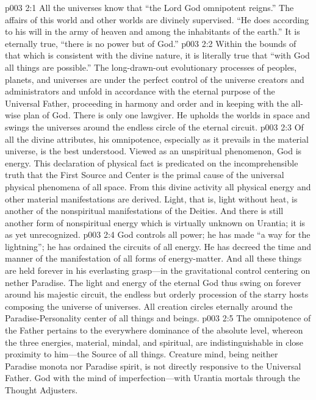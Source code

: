 \vs p003 2:1 All the universes know that “the Lord God omnipotent reigns.” The affairs of this world and other worlds are divinely supervised. “He does according to his will in the army of heaven and among the inhabitants of the earth.” It is eternally true, “there is no power but of God.”
\vs p003 2:2 Within the bounds of that which is consistent with the divine nature, it is literally true that “with God all things are possible.” The long\hyp{}drawn\hyp{}out evolutionary processes of peoples, planets, and universes are under the perfect control of the universe creators and administrators and unfold in accordance with the eternal purpose of the Universal Father, proceeding in harmony and order and in keeping with the all\hyp{}wise plan of God. There is only one lawgiver. He upholds the worlds in space and swings the universes around the endless circle of the eternal circuit.
\vs p003 2:3 Of all the divine attributes, his omnipotence, especially as it prevails in the material universe, is the best understood. Viewed as an unspiritual phenomenon, God is energy. This declaration of physical fact is predicated on the incomprehensible truth that the First Source and Center is the primal cause of the universal physical phenomena of all space. From this divine activity all physical energy and other material manifestations are derived. Light, that is, light without heat, is another of the nonspiritual manifestations of the Deities. And there is still another form of nonspiritual energy which is virtually unknown on Urantia; it is as yet unrecognized.
\vs p003 2:4 God controls all power; he has made “a way for the lightning”; he has ordained the circuits of all energy. He has decreed the time and manner of the manifestation of all forms of energy\hyp{}matter. And all these things are held forever in his everlasting grasp---in the gravitational control centering on nether Paradise. The light and energy of the eternal God thus swing on forever around his majestic circuit, the endless but orderly procession of the starry hosts composing the universe of universes. All creation circles eternally around the Paradise\hyp{}Personality center of all things and beings.
\vs p003 2:5 The omnipotence of the Father pertains to the everywhere dominance of the absolute level, whereon the three energies, material, mindal, and spiritual, are indistinguishable in close proximity to him---the Source of all things. Creature mind, being neither Paradise monota nor Paradise spirit, is not directly responsive to the Universal Father. God  with the mind of imperfection---with Urantia mortals through the Thought Adjusters.
